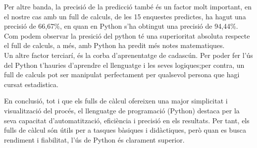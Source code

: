 Per altre banda, la precisió de la predicció també és un factor molt important, en el nostre cas amb un full de calculs, de les 15 enquestes predictes, ha hagut una precisió de 66,67\%, en quan en Python s'ha obtingut una precisió de 94,44\%. Com podem observar la presició del python té una superioritat absoluta respecte el full de calculs, a més, amb Python ha predit més notes matematiques.\\

Un altre factor terciarí, és la corba d'aprenentatge de cadascún. Per poder fer l'ús del Python t'hauries d'aprendre el llenguatge i les seves logiques;per contra, un full de calculs pot ser manipulat perfectament per qualsevol persona que hagi cursat estadistica.

En conclusió, tot i que els fulls de càlcul ofereixen una major simplicitat i visualització del procés, el llenguatge de programació (Python) destaca per la seva capacitat d’automatització, eficiència i precisió en els resultats. Per tant, els fulls de càlcul són útils per a tasques bàsiques i didàctiques, però quan es busca rendiment i fiabilitat, l’ús de Python és clarament superior.























